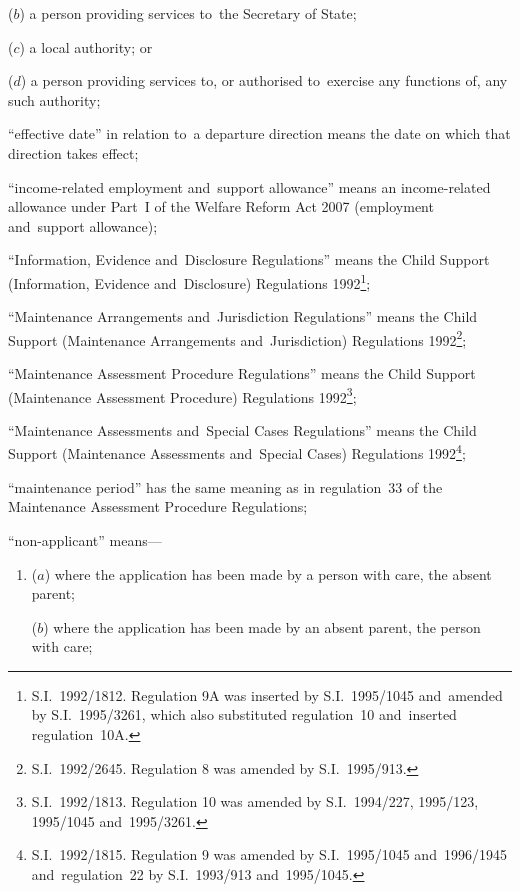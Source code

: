 \documentclass[12pt,a4paper]{article}
\begin{document}
\begin{enumerate}
\begin{enumerate}
    ($b$) 
    a person providing services to~the Secretary of State;

    ($c$) 
    a local authority; or

    ($d$) 
    a person providing services to, or authorised to~exercise any functions of, any such authority;
\end{enumerate}

“effective date” in relation to~a departure direction means the date on which
that direction takes effect;

“income-related employment and~support allowance” means an income-related allowance under Part~I of the Welfare Reform Act 2007 (employment and~support allowance);

“Information, Evidence and~Disclosure Regulations” means the Child Support
(Information, Evidence and~Disclosure) Regulations 1992\footnote{\frenchspacing S.I.~1992/1812. Regulation 9A was inserted by S.I.~1995/1045 and~amended by S.I.~1995/3261, which also substituted regulation~10 and~inserted regulation~10A.};

“Maintenance Arrangements and~Jurisdiction Regulations” means the Child Support
(Maintenance Arrangements and~Jurisdiction) Regulations 1992\footnote{\frenchspacing S.I.~1992/2645. Regulation 8 was amended by S.I.~1995/913.};

“Maintenance Assessment Procedure Regulations” means the Child Support
(Maintenance Assessment Procedure) Regulations 1992\footnote{\frenchspacing S.I.~1992/1813. Regulation 10 was amended by S.I.~1994/227, 1995/123, 1995/1045 and~1995/3261.};

“Maintenance Assessments and~Special Cases Regulations” means the Child Support
(Maintenance Assessments and~Special Cases) Regulations 1992\footnote{\frenchspacing S.I.~1992/1815. Regulation 9 was amended by S.I.~1995/1045 and~1996/1945 and~regulation~22 by S.I.~1993/913 and~1995/1045.};

“maintenance period” has the same meaning as in regulation~33 of the Maintenance
Assessment Procedure Regulations;

“non-applicant” means—
\begin{enumerate}\item[]
($a$) where the application has been made by a person with care, the absent parent;

($b$) where the application has been made by an absent parent, the person with
care;
\end{enumerate}


\end{enumerate}
\end{document}
